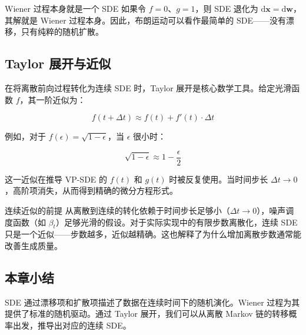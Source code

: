 \begin{knowledgebox}{Wiener 过程本身就是一个 SDE}
如果令 $f = 0$、$g = 1$，则 SDE 退化为 $\mathrm{d}\mathbf{x} = \mathrm{d}\mathbf{w}$，其解就是 Wiener 过程本身。因此，布朗运动可以看作最简单的 SDE——没有漂移，只有纯粹的随机扩散。
\end{knowledgebox}

\subsection{Taylor 展开与近似}

在将离散前向过程转化为连续 SDE 时，Taylor 展开是核心数学工具。给定光滑函数 $f$，其一阶近似为：

$$
f(t + \Delta t) \approx f(t) + f'(t) \cdot \Delta t
$$

例如，对于 $f(\epsilon) = \sqrt{1 - \epsilon}$，当 $\epsilon$ 很小时：

$$
\sqrt{1 - \epsilon} \approx 1 - \frac{\epsilon}{2}
$$

这一近似在推导 VP-SDE 的 $f(t)$ 和 $g(t)$ 时被反复使用。当时间步长 $\Delta t \to 0$，高阶项消失，从而得到精确的微分方程形式。

\begin{warningbox}{连续近似的前提}
从离散到连续的转化依赖于时间步长足够小（$\Delta t \to 0$），噪声调度函数（如 $\beta_t$）足够光滑的假设。对于实际实现中的有限步数离散化，连续 SDE 只是一个近似——步数越多，近似越精确。这也解释了为什么增加离散步数通常能改善生成质量。
\end{warningbox}

\subsection{本章小结}

SDE 通过漂移项和扩散项描述了数据在连续时间下的随机演化。Wiener 过程为其提供了标准的随机驱动。通过 Taylor 展开，我们可以从离散 Markov 链的转移概率出发，推导出对应的连续 SDE。


